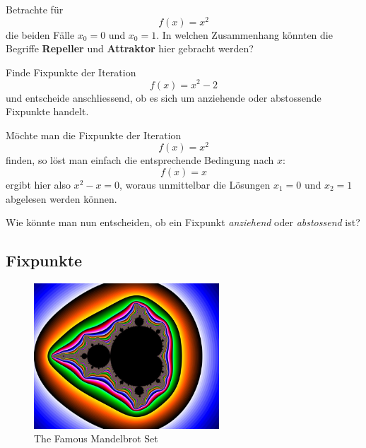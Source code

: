 \documentclass[%
11pt,%
twoside,%
titlepage,%
german,%
headsepline%
]{scrartcl}
\begin{document}
\begin{ueb}
Betrachte für
$$f(x)=x^2$$
die beiden Fälle $x_0=0$ und $x_0=1$. In welchen Zusammenhang könnten die Begriffe \textbf{Repeller} und \textbf{Attraktor} hier gebracht werden?
\end{ueb}

\begin{ueb}[Fixpunkte]
Finde Fixpunkte der Iteration
$$f(x)=x^2-2$$
und entscheide anschliessend, ob es sich um anziehende oder abstossende Fixpunkte handelt.
\end{ueb}

\begin{bsp}
Möchte man die Fixpunkte der Iteration
$$f(x)=x^2$$
finden, so löst man einfach die entsprechende Bedingung nach $x$:
$$f(x)=x$$
ergibt hier also $x^2-x=0$, woraus unmittelbar die Lösungen $x_1=0$ und $x_2=1$ abgelesen werden können.
\end{bsp}

\begin{ueb}
Wie könnte man nun entscheiden, ob ein Fixpunkt \emph{anziehend} oder \emph{abstossend} ist?
\end{ueb}

\subsection{Fixpunkte}
\begin{figure}
\centering
    \includegraphics[width=0.618\textwidth]{pictures/apfelmaennchen}
\caption{The Famous Mandelbrot Set}
\end{figure}
\end{document}
